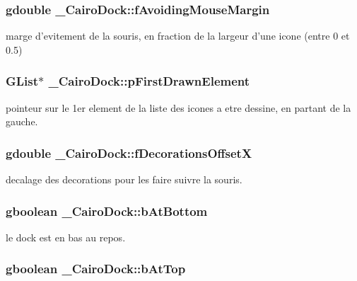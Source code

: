 \subsubsection{\setlength{\rightskip}{0pt plus 5cm}gdouble {\bf \_\-CairoDock::fAvoidingMouseMargin}}\label{struct__CairoDock_90dc53417eda7f4b4fd7eb770e4be693}


marge d'evitement de la souris, en fraction de la largeur d'une icone (entre 0 et 0.5) 

\subsubsection{\setlength{\rightskip}{0pt plus 5cm}GList$\ast$ {\bf \_\-CairoDock::pFirstDrawnElement}}\label{struct__CairoDock_6765b88fb98c987436d90f64867f67cf}


pointeur sur le 1er element de la liste des icones a etre dessine, en partant de la gauche. 

\subsubsection{\setlength{\rightskip}{0pt plus 5cm}gdouble {\bf \_\-CairoDock::fDecorationsOffsetX}}\label{struct__CairoDock_9e0bac6ce7af6108cff1bb7dd75115c9}


decalage des decorations pour les faire suivre la souris. 

\subsubsection{\setlength{\rightskip}{0pt plus 5cm}gboolean {\bf \_\-CairoDock::bAtBottom}}\label{struct__CairoDock_086f848a4a78d10afb853e7f85441c5f}


le dock est en bas au repos. 

\subsubsection{\setlength{\rightskip}{0pt plus 5cm}gboolean {\bf \_\-CairoDock::bAtTop}}\label{struct__CairoDock_2451c4ec51ea3b0a422b0897c7524c99}


